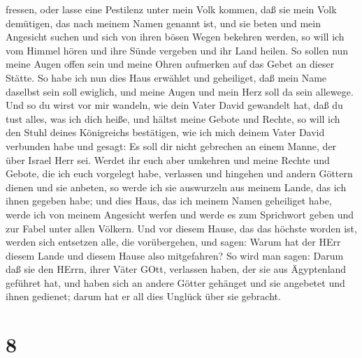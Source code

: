 fressen, oder lasse eine Pestilenz unter mein Volk kommen, 
daß sie mein Volk demütigen, das nach meinem Namen genannt ist, und sie
beten und mein Angesicht suchen und sich von ihren bösen Wegen bekehren
werden, so will ich vom Himmel hören und ihre Sünde vergeben und ihr
Land heilen.  So sollen nun meine Augen offen sein und
meine Ohren aufmerken auf das Gebet an dieser Stätte.  So
habe ich nun dies Haus erwählet und geheiliget, daß mein Name daselbst
sein soll ewiglich, und meine Augen und mein Herz soll da sein allewege.
 Und so du wirst vor mir wandeln, wie dein Vater David
gewandelt hat, daß du tust alles, was ich dich heiße, und hältst meine
Gebote und Rechte,  so will ich den Stuhl deines
Königreichs bestätigen, wie ich mich deinem Vater David verbunden habe
und gesagt: Es soll dir nicht gebrechen an einem Manne, der über Israel
Herr sei.  Werdet ihr euch aber umkehren und meine Rechte
und Gebote, die ich euch vorgelegt habe, verlassen und hingehen und
andern Göttern dienen und sie anbeten,  so werde ich sie
auswurzeln aus meinem Lande, das ich ihnen gegeben habe; und dies Haus,
das ich meinem Namen geheiliget habe, werde ich von meinem Angesicht
werfen und werde es zum Sprichwort geben und zur Fabel unter allen
Völkern.  Und vor diesem Hause, das das höchste worden ist,
werden sich entsetzen alle, die vorübergehen, und sagen: Warum hat der
HErr diesem Lande und diesem Hause also mitgefahren?  So
wird man sagen: Darum daß sie den HErrn, ihrer Väter GOtt, verlassen
haben, der sie aus Ägyptenland geführet hat, und haben sich an andere
Götter gehänget und sie angebetet und ihnen gedienet; darum hat er all
dies Unglück über sie gebracht.

\hypertarget{section-7}{%
\section{8}\label{section-7}}

